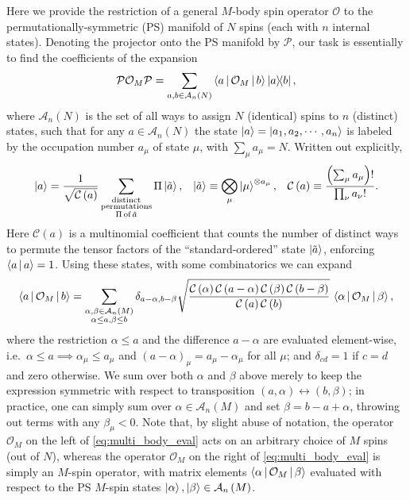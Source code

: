 \documentclass[nofootinbib,twocolumn]{revtex4-2}
\renewcommand{\t}{\text} %
\newcommand{\f}[2]{\dfrac{#1}{#2}} %
\newcommand{\p}[1]{\left(#1\right)} %
\newcommand{\bk}{\Braket} %
\newcommand{\1}{\mathds{1}}
\newcommand{\A}{\mathcal{A}}
\newcommand{\C}{\mathcal{C}}
\renewcommand{\O}{\mathcal{O}}
\renewcommand{\P}{\mathcal{P}}
\begin{document}
Here we provide the restriction of a general $M$-body spin operator $\O$ to the permutationally-symmetric (PS) manifold of $N$ spins (each with $n$ internal states).
Denoting the projector onto the PS manifold by $\P$, our task is essentially to find the coefficients of the expansion
\begin{align}
  \P \O_M \P = \sum_{a,b\in\A_n\p{N}} \bk{a|\O_M|b} \op{a}{b},
\end{align}
where $\A_n\p{N}$ is the set of all ways to assign $N$ (identical) spins to $n$ (distinct) states, such that for any $a\in\A_n\p{N}$ the state $\ket{a}=\ket{a_1,a_2,\cdots,a_n}$ is labeled by the occupation number $a_\mu$ of state $\mu$, with $\sum_\mu a_\mu=N$.
Written out explicitly,
\begin{align}
  \ket{a} = \f1{\sqrt{\C\p{a}}}
  \sum_{\substack{\t{distinct}\\\t{permutations}\\\Pi\,\t{of}\,\tilde a}}
  \Pi\ket{\tilde a},
  &&
  \ket{\tilde a} \equiv \bigotimes_\mu \ket{\mu}^{\otimes a_\mu},
  &&
  \C\p{a} \equiv \f{\p{\sum_\mu a_\mu}!}{\prod_\nu a_\nu!}.
\end{align}
Here $\C\p{a}$ is a multinomial coefficient that counts the number of distinct ways to permute the tensor factors of the ``standard-ordered'' state $\ket{\tilde a}$, enforcing $\bk{a|a}=1$.
Using these states, with some combinatorics we can expand
\begin{align}
  \bk{a|\O_M|b} =
  \sum_{\substack{\alpha,\beta\in\A_n\p{M}\\\alpha\le a,\beta\le b}}
  \delta_{a-\alpha,b-\beta}
  \sqrt{\f{\C\p{\alpha}\C\p{a-\alpha}\C\p{\beta}\C\p{b-\beta}}
    {\C\p{a}\C\p{b}}}
  \, \bk{\alpha|\O_M|\beta},
  \label{eq:multi_body_eval}
\end{align}
where the restriction $\alpha\le a$ and the difference $a-\alpha$ are evaluated element-wise, i.e.~$\alpha\le a\implies\alpha_\mu\le a_\mu$ and $\p{a-\alpha}_\mu=a_\mu-\alpha_\mu$ for all $\mu$; and $\delta_{cd}=1$ if $c=d$ and zero otherwise.
We sum over both $\alpha$ and $\beta$ above merely to keep the expression symmetric with respect to transposition $\p{a,\alpha}\leftrightarrow\p{b,\beta}$; in practice, one can simply sum over $\alpha\in\A_n\p{M}$ and set $\beta=b-a+\alpha$, throwing out terms with any $\beta_\mu<0$.
Note that, by slight abuse of notation, the operator $\O_M$ on the left of \eqref{eq:multi_body_eval} acts on an arbitrary choice of $M$ spins (out of $N$), whereas the operator $\O_M$ on the right of \eqref{eq:multi_body_eval} is simply an $M$-spin operator, with matrix elements $\bk{\alpha|\O_M|\beta}$ evaluated with respect to the PS $M$-spin states $\ket\alpha,\ket\beta\in\A_n\p{M}$.
\end{document}
